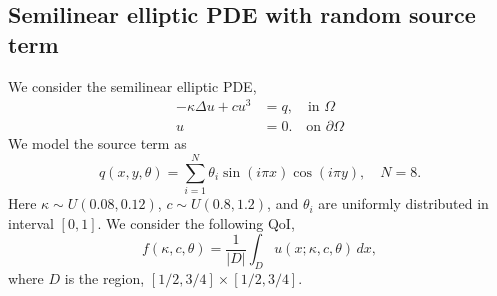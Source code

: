 \subsection{Semilinear elliptic PDE with random source term}

We consider the semilinear elliptic PDE,
\begin{equation}\label{equ:semilinear}
\begin{aligned}
-\kappa \Delta u + c u^3 &= q, \quad \text{in } \Omega\\
 u &= 0. \quad \text{on } \partial \Omega
\end{aligned}
\end{equation}
We model the source term as 
\begin{equation}
q(x, y, \theta) = \sum_{i = 1}^N \theta_i \sin(i \pi x)
\cos(i \pi y),
\quad N = 8.
\end{equation}
Here $\kappa \sim U(0.08, 0.12)$, $c \sim U(0.8, 1.2)$, 
and $\theta_i$ are uniformly distributed in interval $[0, 1]$. We consider
the following QoI,
\[
     f(\kappa, c, \theta) = \frac{1}{|D|} \int_D u(x; \kappa, c, \theta) \, dx, 
\]
where $D$ is the region, $[1/2, 3/4] \times [1/2, 3/4]$.

































